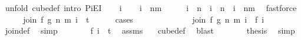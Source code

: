 \begin{isabellebody}
%
\isadelimproof
%
\endisadelimproof
%
\isatagproof
{}\isamarkupfalse%
\ {\isacharparenleft}{\kern0pt}unfold\ cube{\isacharunderscore}{\kern0pt}def{\isacharsemicolon}{\kern0pt}\ intro\ PiE{\isacharunderscore}{\kern0pt}I{\isacharparenright}{\kern0pt}\isanewline
\ \ \isamarkupfalse%
\ i\isanewline
\ \ \isamarkupfalse%
\ {\isachardoublequoteopen}i\ {\isasymin}\ {\isacharbraceleft}{\kern0pt}{\isachardot}{\kern0pt}{\isachardot}{\kern0pt}{\isacharless}{\kern0pt}n{\isacharplus}{\kern0pt}m{\isacharbraceright}{\kern0pt}{\isachardoublequoteclose}\isanewline
\ \ \isamarkupfalse%
\ \isamarkupfalse%
\ {\isachardoublequoteopen}i\ {\isacharless}{\kern0pt}\ n{\isachardoublequoteclose}\ {\isacharbar}{\kern0pt}\ {\isachardoublequoteopen}i\ {\isasymge}\ n\ {\isasymand}\ i\ {\isacharless}{\kern0pt}\ n{\isacharplus}{\kern0pt}m{\isachardoublequoteclose}\ \isamarkupfalse%
\ fastforce\isanewline
\ \ \isamarkupfalse%
\ \isamarkupfalse%
\ {\isachardoublequoteopen}join\ f\ g\ n\ m\ i\ {\isasymin}\ {\isacharbraceleft}{\kern0pt}{\isachardot}{\kern0pt}{\isachardot}{\kern0pt}{\isacharless}{\kern0pt}t\ {\isacharplus}{\kern0pt}\ {}{\isacharbraceright}{\kern0pt}{\isachardoublequoteclose}\isanewline
\ \ \isamarkupfalse%
\ {\isacharparenleft}{\kern0pt}cases{\isacharparenright}{\kern0pt}\isanewline
\ \ \ \ \isamarkupfalse%
\ {}\isanewline
\ \ \ \ \isamarkupfalse%
\ \isamarkupfalse%
\ {\isachardoublequoteopen}join\ f\ g\ n\ m\ i\ {\isacharequal}{\kern0pt}\ f\ i{\isachardoublequoteclose}\ \isamarkupfalse%
\ join{\isacharunderscore}{\kern0pt}def\ \isamarkupfalse%
\ simp\isanewline
\ \ \ \ \isamarkupfalse%
\ \isamarkupfalse%
\ {\isachardoublequoteopen}f\ i\ {\isasymin}\ {\isacharbraceleft}{\kern0pt}{\isachardot}{\kern0pt}{\isachardot}{\kern0pt}{\isacharless}{\kern0pt}t{\isacharplus}{\kern0pt}{}{\isacharbraceright}{\kern0pt}{\isachardoublequoteclose}\ \isamarkupfalse%
\ assms{\isacharparenleft}{\kern0pt}{}{\isacharparenright}{\kern0pt}\ {}\ \isamarkupfalse%
\ cube{\isacharunderscore}{\kern0pt}def\ \isamarkupfalse%
\ blast\isanewline
\ \ \ \ \isamarkupfalse%
\ \isamarkupfalse%
\ {\isacharquery}{\kern0pt}thesis\ \isamarkupfalse%
\ simp\isanewline
\ \ \isamarkupfalse%

\end{isabellebody}
